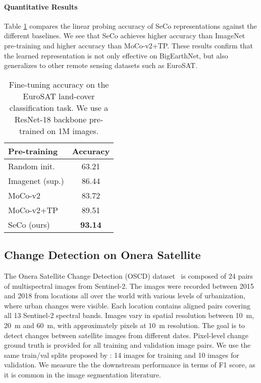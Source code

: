 \documentclass[10pt,twocolumn,letterpaper]{article}
\newcommand{\methodname}[0]{SeCo}
\begin{document}
\vspace{-1em}\paragraph{Quantitative Results}
Table \ref{tab:eurosat_results} compares the linear probing accuracy of \methodname{} representations against the different baselines. We see that \methodname{} achieves  higher accuracy than ImageNet pre-training and  higher accuracy than MoCo-v2+TP. These results confirm that the learned representation is not only effective on BigEarthNet, but also generalizes to other remote sensing datasets such as EuroSAT.



\begin{table}[t]
    \begin{center}
    \begin{tabular}{l|c}
        \toprule
        Pre-training & Accuracy \\
        \hline\hline
        Random init. & 63.21 \\
        Imagenet (sup.) & 86.44 \\
        \hline
        MoCo-v2 & 83.72 \\
        MoCo-v2+TP & 89.51 \\
        SeCo (ours) & \textbf{93.14} \\
        \bottomrule
    \end{tabular}
    \end{center}
    \caption{Fine-tuning accuracy on the EuroSAT land-cover classification task. We use a ResNet-18 backbone pre-trained on 1M images.}
    \label{tab:eurosat_results}
\end{table}

\subsection{Change Detection on Onera Satellite}
The Onera Satellite Change Detection (OSCD) dataset~\citep{daudt2018urban} is composed of 24 pairs of multispectral images from Sentinel-2. The images were recorded between 2015 and 2018 from locations all over the world with various levels of urbanization, where urban changes were visible. Each location contains aligned pairs covering all 13 Sentinel-2 spectral bands. Images vary in spatial resolution between 10~m, 20~m and 60~m, with approximately  pixels at 10~m resolution. The goal is to detect changes between satellite images from different dates. Pixel-level change ground truth is provided for all training and validation image pairs. We use the same train/val splits proposed by \citet{daudt2018urban}: 14 images for training and 10 images for validation. We measure the the downstream performance in terms of F1 score, as it is common in the image segmentation literature.
\end{document}
